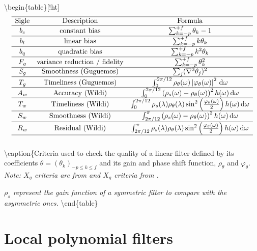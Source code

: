 \documentclass[
  12pt,
  ,
  a4paper]{article}
\newcommand\1{\mathds{1}}
\newcommand\ud{\,\mathrm{d}}
\begin{document}
\textbackslash begin\{table\}{[}!ht{]}
\[
\begin{array}{ccc}
\hline \text{Sigle} & \text{Description} & \text{Formula}\\
\hline b_{c} & \text{constant bias} & \sum_{k=-p}^{+f}\theta_{k}-1\\
\hline b_{l} & \text{linear bias} & \sum_{k=-p}^{+f}k\theta_{k}\\
\hline b_{q} & \text{quadratic bias} & \sum_{k=-p}^{+f}k^{2}\theta_{k}\\
\hline F_{g} & \text{variance reduction / fidelity} & \sum_{k=-p}^{+f}\theta_{k}^{2}\\
\hline S_{g} & \text{Smoothness (Guguemos)} & \sum_{j}(\nabla^{3}\theta_{j})^{2}\\
\hline T_{g} & \text{Timeliness (Guguemos)} & \int_{0}^{2\pi/12}\rho_{\theta}(\omega)\left|\varphi_{\theta}(\omega)\right|^{2}\ud\omega\\
\hline A_{w} & \text{Accuracy (Wildi)} & \int_0^{2\pi/12}\left(\rho_{s}(\omega)-\rho_{\theta}(\omega)\right)^{2}h(\omega)\ud\omega\\
\hline T_{w} & \text{Timeliness (Wildi)} & \int_0^{2\pi/12} \rho_{s}(\lambda)\rho_{\theta}(\lambda)\sin^{2}\left(\frac{\varphi_\theta(\omega)}{2}\right)h(\omega)\ud\omega\\
\hline S_{w} & \text{Smoothness (Wildi)} & \int_{2\pi/12}^{\pi}\left(\rho_{s}(\omega)-\rho_{\theta}(\omega)\right)^{2}h(\omega)\ud\omega\\
\hline R_{w} & \text{Residual (Wildi)} & \int_{2\pi/12}^{\pi} \rho_{s}(\lambda)\rho_{\theta}(\lambda)\sin^{2}\left(\frac{\varphi_\theta(\omega)}{2}\right)h(\omega)\ud\omega\\
\hline \\
\end{array}
\]
\textbackslash caption\{Criteria used to check the quality of a linear filter defined by its coefficients \(\theta=(\theta_k)_{-p\leq k\leq f}\) and its gain and phase shift function, \(\rho_{\theta}\) and \(\varphi_\theta\).
\label{tab:QC}
\footnotesize
\emph{Note: $X_g$ criteria are from \textcite{ch15HBSA} and $X_g$ criteria from \textcite{trilemmaWMR2019}.}

\emph{$\rho_s$ represent the gain function of a symmetric filter to compare with the asymmetric ones.}
\textbackslash end\{table\}

\hypertarget{sec:lppfilters}{%
\section{Local polynomial filters}\label{sec:lppfilters}}
\end{document}
